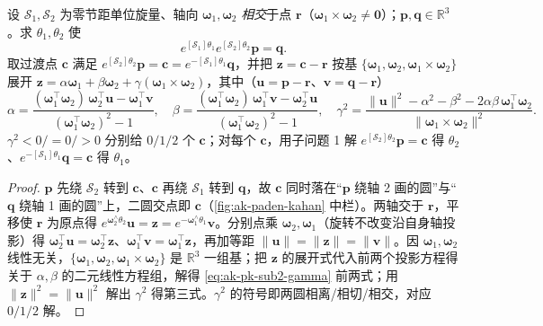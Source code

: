 \begin{theorem}\label{thm:ak-pk-sub2}
设 $\mathcal{S}_1,\mathcal{S}_2$ 为零节距单位旋量、轴向 $\boldsymbol{\omega}_1,\boldsymbol{\omega}_2$ \emph{相交}于点 $\mathbf{r}$（$\boldsymbol{\omega}_1\times\boldsymbol{\omega}_2\neq\mathbf{0}$）；$\mathbf{p},\mathbf{q}\in\mathbb{R}^3$。求 $\theta_1,\theta_2$ 使\cite{murray1994mathematical}
\begin{equation}
e^{[\mathcal{S}_1]\theta_1}e^{[\mathcal{S}_2]\theta_2}\mathbf{p}=\mathbf{q}.
\label{eq:ak-pk-sub2}
\end{equation}
取过渡点 $\mathbf{c}$ 满足 $e^{[\mathcal{S}_2]\theta_2}\mathbf{p}=\mathbf{c}=e^{-[\mathcal{S}_1]\theta_1}\mathbf{q}$，并把 $\mathbf{z}=\mathbf{c}-\mathbf{r}$ 按基 $\{\boldsymbol{\omega}_1,\boldsymbol{\omega}_2,\boldsymbol{\omega}_1\times\boldsymbol{\omega}_2\}$ 展开 $\mathbf{z}=\alpha\boldsymbol{\omega}_1+\beta\boldsymbol{\omega}_2+\gamma(\boldsymbol{\omega}_1\times\boldsymbol{\omega}_2)$，其中（$\mathbf{u}=\mathbf{p}-\mathbf{r}$、$\mathbf{v}=\mathbf{q}-\mathbf{r}$）
\begin{equation}
\alpha=\frac{(\boldsymbol{\omega}_1^\top\boldsymbol{\omega}_2)\,\boldsymbol{\omega}_2^\top\mathbf{u}-\boldsymbol{\omega}_1^\top\mathbf{v}}{(\boldsymbol{\omega}_1^\top\boldsymbol{\omega}_2)^2-1},\quad
\beta=\frac{(\boldsymbol{\omega}_1^\top\boldsymbol{\omega}_2)\,\boldsymbol{\omega}_1^\top\mathbf{v}-\boldsymbol{\omega}_2^\top\mathbf{u}}{(\boldsymbol{\omega}_1^\top\boldsymbol{\omega}_2)^2-1},\quad
\gamma^2=\frac{\|\mathbf{u}\|^2-\alpha^2-\beta^2-2\alpha\beta\,\boldsymbol{\omega}_1^\top\boldsymbol{\omega}_2}{\|\boldsymbol{\omega}_1\times\boldsymbol{\omega}_2\|^2}.
\label{eq:ak-pk-sub2-gamma}
\end{equation}
$\gamma^2<0/=0/>0$ 分别给 $0/1/2$ 个 $\mathbf{c}$；对每个 $\mathbf{c}$，用子问题 1 解 $e^{[\mathcal{S}_2]\theta_2}\mathbf{p}=\mathbf{c}$ 得 $\theta_2$、$e^{-[\mathcal{S}_1]\theta_1}\mathbf{q}=\mathbf{c}$ 得 $\theta_1$。
\end{theorem}
\begin{proof}
$\mathbf{p}$ 先绕 $\mathcal{S}_2$ 转到 $\mathbf{c}$、$\mathbf{c}$ 再绕 $\mathcal{S}_1$ 转到 $\mathbf{q}$，故 $\mathbf{c}$ 同时落在“$\mathbf{p}$ 绕轴 2 画的圆”与“$\mathbf{q}$ 绕轴 1 画的圆”上，二圆交点即 $\mathbf{c}$（\cref{fig:ak-paden-kahan} 中栏）。两轴交于 $\mathbf{r}$，平移使 $\mathbf{r}$ 为原点得 $e^{\boldsymbol{\omega}_2^\wedge\theta_2}\mathbf{u}=\mathbf{z}=e^{-\boldsymbol{\omega}_1^\wedge\theta_1}\mathbf{v}$。分别点乘 $\boldsymbol{\omega}_2,\boldsymbol{\omega}_1$（旋转不改变沿自身轴投影）得 $\boldsymbol{\omega}_2^\top\mathbf{u}=\boldsymbol{\omega}_2^\top\mathbf{z}$、$\boldsymbol{\omega}_1^\top\mathbf{v}=\boldsymbol{\omega}_1^\top\mathbf{z}$，再加等距 $\|\mathbf{u}\|=\|\mathbf{z}\|=\|\mathbf{v}\|$。因 $\boldsymbol{\omega}_1,\boldsymbol{\omega}_2$ 线性无关，$\{\boldsymbol{\omega}_1,\boldsymbol{\omega}_2,\boldsymbol{\omega}_1\times\boldsymbol{\omega}_2\}$ 是 $\mathbb{R}^3$ 一组基；把 $\mathbf{z}$ 的展开式代入前两个投影方程得关于 $\alpha,\beta$ 的二元线性方程组，解得 \cref{eq:ak-pk-sub2-gamma} 前两式；用 $\|\mathbf{z}\|^2=\|\mathbf{u}\|^2$ 解出 $\gamma^2$ 得第三式。$\gamma^2$ 的符号即两圆相离/相切/相交，对应 $0/1/2$ 解。
\end{proof}

